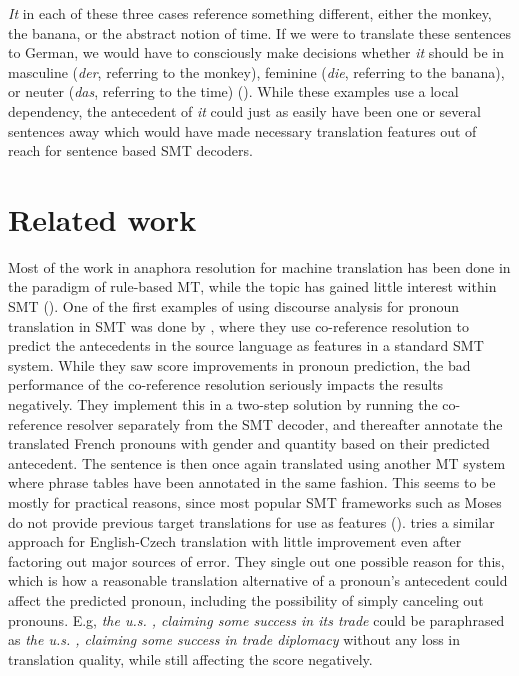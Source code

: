 \documentclass[11pt]{article}
\begin{document}
\emph{It} in each of these three cases reference something different, either the monkey, the banana, or the abstract notion of time. If we were to translate these sentences to German, we would have to consciously make decisions whether \emph{it} should be in masculine (\emph{der}, referring to the monkey), feminine (\emph{die}, referring to the banana), or neuter (\emph{das}, referring to the time) (\cite{Mitkov1995Anaphora}). While these examples use a local dependency, the antecedent of \emph{it} could just as easily have been one or several sentences away which would have made necessary translation features out of reach for sentence based SMT decoders.


\section{Related work}


Most of the work in anaphora resolution for machine translation has been done in the paradigm of rule-based MT, while the topic has gained little interest within SMT (\cite{Hardmeier2010Modelling, Mitkov1999Introduction}).
One of the first examples of using discourse analysis for pronoun translation in SMT was done by \textcite{Nagard2010Aiding}, where they use co-reference resolution to predict the antecedents in the source language as features in a standard SMT system.
While they saw score improvements in pronoun prediction, the bad performance of the co-reference resolution seriously impacts the results negatively.
They implement this in a two-step solution by running the co-reference resolver separately from the SMT decoder, and thereafter annotate the translated French pronouns with gender and quantity based on their predicted antecedent. The sentence is then once again translated using another MT system where phrase tables have been annotated in the same fashion.
This seems to be mostly for practical reasons, since most popular SMT frameworks such as Moses do not provide previous target translations for use as features (\cite{Koehn2007Moses}).
\textcite{Guillou2012Improving} tries a similar approach for English-Czech translation with little improvement even after factoring out major sources of error. They single out one possible reason for this, which is how a reasonable translation alternative of a pronoun's antecedent could affect the predicted pronoun, including the possibility of simply canceling out pronouns. E.g, \emph{the u.s. , claiming some success in its trade} could be paraphrased as \emph{the u.s. , claiming some success in trade diplomacy} without any loss in translation quality, while still affecting the score negatively.
\end{document}
